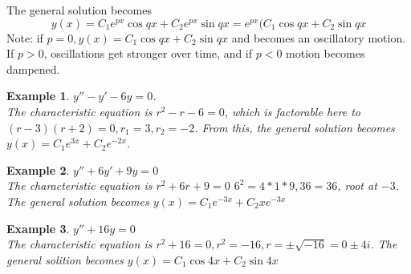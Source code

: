 \documentclass{article}
\newtheorem{example}{Example}
\begin{document}
\begin{enumerate}
		The general solution becomes 
		\begin{equation}
			y(x)=C_1e^{px}\cos{qx}+C_2e^{px}\sin{qx}=e^{px}(C_1\cos{qx}+C_2\sin{qx}
		\end{equation}
		Note: if $p=0, y(x)=C_1\cos{qx}+C_2\sin{qx}$ and becomes an oscillatory motion. 
		If $p>0$, oscillations get stronger over time, and if $p<0$ motion becomes dampened.
\end{enumerate}

\begin{example} $y''-y'-6y=0$. \\The characteristic equation is $r^2-r-6=0$, which is factorable here to $(r-3)(r+2)=0, r_1=3, r_2=-2$. From this, the general solution becomes $y(x)=C_1e^{3x}+C_2e^{-2x}$.
\end{example}
\begin{example} $y''+6y'+9y=0$
	\\The characteristic equation is $r^2+6r+9=0$ $6^2=4*1*9, 36=36$, root at $-3$. 
	The general solution becomes $y(x)=C_1 e^{-3x}+C_2xe^{-3x}$
\end{example}
\begin{example}
	$y''+16y=0$
	\\The characteristic equation is $r^2+16=0, r^2=-16, r=\pm\sqrt{-16}=0\pm4i$.
	The general solition becomes $y(x)=C_1\cos{4x}+C_2\sin{4x}$
\end{example}
\end{document}
